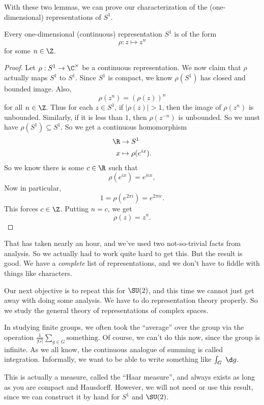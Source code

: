 \documentclass[a4paper]{article}
\begin{document}
With these two lemmas, we can prove our characterization of the (one-dimensional) representations of $S^1$.
\begin{thm}
  Every one-dimensional (continuous) representation $S^1$ is of the form
  \[
    \rho: z \mapsto z^n
  \]
  for some $n \in \Z$.
\end{thm}

\begin{proof}
  Let $\rho: S^1 \to \C^\times$ be a continuous representation. We now claim that $\rho$ actually maps $S^1$ to $S^1$. Since $S^1$ is compact, we know $\rho(S^1)$ has closed and bounded image. Also,
  \[
    \rho(z^n) = (\rho(z))^n
  \]
  for all $n \in \Z$. Thus for each $z \in S^1$, if $|\rho(z)| > 1$, then the image of $\rho(z^n)$ is unbounded. Similarly, if it is less than $1$, then $\rho(z^{-n})$ is unbounded. So we must have $\rho(S^1) \subseteq S^1$. So we get a continuous homomorphism
  \begin{align*}
    \R &\to S^1\\
    x &\mapsto \rho(e^{ix}).
  \end{align*}
  So we know there is some $c \in \R$ such that
  \[
    \rho(e^{ix}) = e^{icx},
  \]
  Now in particular,
  \[
    1 = \rho(e^{2 \pi i}) = e^{2\pi i c}.
  \]
  This forces $c \in \Z$. Putting $n = c$, we get
  \[
    \rho(z) = z^n.
  \]
\end{proof}
That has taken nearly an hour, and we've used two not-so-trivial facts from analysis. So we actually had to work quite hard to get this. But the result is good. We have a \emph{complete} list of representations, and we don't have to fiddle with things like characters.

Our next objective is to repeat this for $\SU(2)$, and this time we cannot just get away with doing some analysis. We have to do representation theory properly. So we study the general theory of representations of complex spaces.

In studying finite groups, we often took the ``average'' over the group via the operation $\frac{1}{|G|} \sum_{g \in G}\text{something}$. Of course, we can't do this now, since the group is infinite. As we all know, the continuous analogue of summing is called integration. Informally, we want to be able to write something like $\int_G \;\d g$.

This is actually a measure, called the ``Haar measure'', and always exists as long as you are compact and Hausdorff. However, we will not need or use this result, since we can construct it by hand for $S^1$ and $\SU(2)$.
\end{document}
